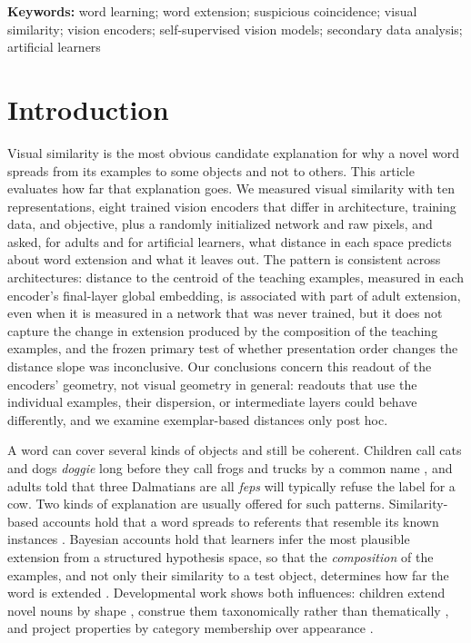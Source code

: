 \documentclass[11pt]{article}
\begin{document}
\begin{abstract}
of word extension across architectures, even without training, but does not capture the effect of example composition; in post hoc checks, distances to the individual examples did not capture it either. Analyses followed internal plans fixed before the confirmatory runs (not externally preregistered).
\end{abstract}

\vspace{-0.6em}
\noindent\textbf{Keywords:} word learning; word extension; suspicious coincidence; visual similarity; vision encoders; self-supervised vision models; secondary data analysis; artificial learners

\section{Introduction}

Visual similarity is the most obvious candidate explanation for why a novel word spreads from its examples to some objects and not to others. This article evaluates how far that explanation goes. We measured visual similarity with ten representations, eight trained vision encoders that differ in architecture, training data, and objective, plus a randomly initialized network and raw pixels, and asked, for adults and for artificial learners, what distance in each space predicts about word extension and what it leaves out. The pattern is consistent across architectures: distance to the centroid of the teaching examples, measured in each encoder's final-layer global embedding, is associated with part of adult extension, even when it is measured in a network that was never trained, but it does not capture the change in extension produced by the composition of the teaching examples, and the frozen primary test of whether presentation order changes the distance slope was inconclusive. Our conclusions concern this readout of the encoders' geometry, not visual geometry in general: readouts that use the individual examples, their dispersion, or intermediate layers could behave differently, and we examine exemplar-based distances only post hoc.

A word can cover several kinds of objects and still be coherent. Children call cats and dogs \emph{doggie} long before they call frogs and trucks by a common name \parencite{rescorla1980}, and adults told that three Dalmatians are all \emph{feps} will typically refuse the label for a cow. Two kinds of explanation are usually offered for such patterns. Similarity-based accounts hold that a word spreads to referents that resemble its known instances \parencite{sloutsky2004,nosofsky1986}. Bayesian accounts hold that learners infer the most plausible extension from a structured hypothesis space, so that the \emph{composition} of the examples, and not only their similarity to a test object, determines how far the word is extended \parencite{xu2007}. Developmental work shows both influences: children extend novel nouns by shape \parencite{landau1988}, construe them taxonomically rather than thematically \parencite{markman1984}, and project properties by category membership over appearance \parencite{gelman1986}.
\end{document}

